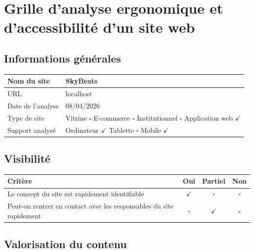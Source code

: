 \documentclass[11pt,a4paper]{article}
\begin{document}
\section*{Grille d'analyse ergonomique et d'accessibilité d'un site web}

\subsection*{Informations générales}

\begin{tabular}{|p{6cm}|p{9cm}|}
\hline
Nom du site & SkyBeats \\ \hline
URL & localhost \\ \hline
Date de l'analyse & 08/04/2026 \\ \hline
Type de site & Vitrine $\square$ \quad E-commerce $\square$ \quad Institutionnel $\square$ \quad Application web $\checkmark$ \\ \hline
Support analysé & Ordinateur $\checkmark$ \quad Tablette $\square$ \quad Mobile $\checkmark$ \\ \hline
\end{tabular}

\subsection*{Visibilité}

\begin{longtable}{|p{9cm}|c|c|c|}
\hline
\textbf{Critère} & \textbf{Oui} & \textbf{Partiel} & \textbf{Non} \\ \hline
\endhead
Le concept du site est rapidement identifiable & $\checkmark$ & $\square$ & $\square$ \\ \hline
Peut-on rentrer en contact avec les responsables du site rapidement & $\square$ & $\checkmark$ & $\square$ \\ \hline
\end{longtable}

\subsection*{Valorisation du contenu}
\end{document}
